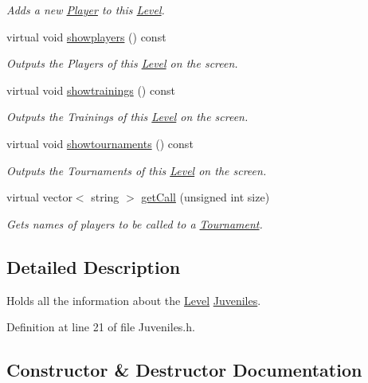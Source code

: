 \begin{DoxyCompactItemize}
\begin{DoxyCompactList}\small\item\em Adds a new \hyperlink{class_player}{Player} to this \hyperlink{class_level}{Level}. \end{DoxyCompactList}\item 
virtual void \hyperlink{class_juveniles_ae66be24e5e17ce8583ff59c45ff4a772}{showplayers} () const
\begin{DoxyCompactList}\small\item\em Outputs the Players of this \hyperlink{class_level}{Level} on the screen. \end{DoxyCompactList}\item 
virtual void \hyperlink{class_juveniles_a168139683f59bca317a7d55cd33be5ac}{showtrainings} () const
\begin{DoxyCompactList}\small\item\em Outputs the Trainings of this \hyperlink{class_level}{Level} on the screen. \end{DoxyCompactList}\item 
virtual void \hyperlink{class_juveniles_a8502c64d6a2cefda618003da25db3cda}{showtournaments} () const
\begin{DoxyCompactList}\small\item\em Outputs the Tournaments of this \hyperlink{class_level}{Level} on the screen. \end{DoxyCompactList}\item 
virtual vector$<$ string $>$ \hyperlink{class_juveniles_a062cff0b64c844c3e9cc9b41e768cce6}{get\+Call} (unsigned int size)
\begin{DoxyCompactList}\small\item\em Gets names of players to be called to a \hyperlink{class_tournament}{Tournament}. \end{DoxyCompactList}\end{DoxyCompactItemize}


\subsection{Detailed Description}
Holds all the information about the \hyperlink{class_level}{Level} \hyperlink{class_juveniles}{Juveniles}. 

Definition at line 21 of file Juveniles.\+h.



\subsection{Constructor \& Destructor Documentation}
\hypertarget{class_juveniles_a01be3288bd98fed2069a5a4d230a6a45}{}\label{class_juveniles_a01be3288bd98fed2069a5a4d230a6a45} 
